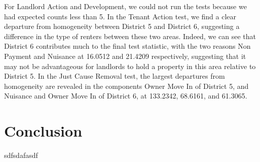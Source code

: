 \documentclass[]{article}
\begin{document}
For Landlord Action and Development, we could not run the tests because we had expected counts less than 5.
\newline\newline
In the Tenant Action test, we find a clear departure from homogeneity between District 5 and District 6, suggesting a difference in the type of renters between these two areas. Indeed, we can see that District 6 contributes much to the final test statistic, with the two reasons Non Payment and Nuisance at 16.0512 and 21.4209 respectively, suggesting that it may not be advantageous for landlords to hold a property in this area relative to District 5.
\newline\newline
In the Just Cause Removal test, the largest departures from homogeneity are revealed in the components Owner Move In of District 5, and Nuisance and Owner Move In of District 6, at 133.2342, 68.6161, and 61.3065.


\section{Conclusion}
sdfsdafasdf
\newpage
\appendix
\end{document}
